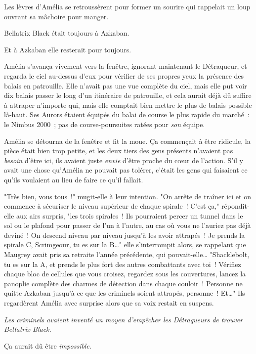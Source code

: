 Les lèvres d'Amélia se retroussèrent pour former un sourire qui rappelait un loup ouvrant sa mâchoire pour manger.

Bellatrix Black était toujours à Azkaban.

Et à Azkaban elle resterait pour toujours.

Amélia s'avança vivement vers la fenêtre, ignorant maintenant le Détraqueur, et regarda le ciel au-dessus d'eux pour vérifier de ses propres yeux la présence des balais en patrouille. Elle n'avait pas une vue complète du ciel, mais elle put voir dix balais passer le long d'un itinéraire de patrouille, et cela aurait déjà dû suffire à attraper n'importe qui, mais elle comptait bien mettre le plus de balais possible là-haut. Ses Aurors étaient équipés du balai de course le plus rapide du marché~: le Nimbus 2000~; pas de course-poursuites ratées pour \emph{son} équipe.

Amélia se détourna de la fenêtre et fit la moue. Ça commençait à être ridicule, la pièce était bien trop petite, et les deux tiers des gens présents n'avaient pas \emph{besoin} d'être ici, ils avaient juste \emph{envie} d'être proche du cœur de l'action. S'il y avait une chose qu'Amélia ne pouvait pas tolérer, c'était les gens qui faisaient ce qu'ils voulaient au lieu de faire ce qu'il fallait.

"Très bien, vous tous~!" mugit-elle à leur intention. "On arrête de traîner ici et on commence à sécuriser le niveau supérieur de chaque spirale~! C'est ça," répondit-elle aux airs surpris, "les trois spirales~! Ils pourraient percer un tunnel dans le sol ou le plafond pour passer de l'un à l'autre, au cas où vous ne l'auriez pas déjà deviné~! On descend niveau par niveau jusqu'à les avoir attrapés~! Je prends la spirale C, Scrimgeour, tu es sur la B…" elle s'interrompit alors, se rappelant que Maugrey avait pris sa retraite l'année précédente, qui pouvait-elle… "Shacklebolt, tu es sur la A, et prends le plus fort des autres combattants avec toi~! Vérifiez chaque bloc de cellules que vous croisez, regardez sous les couvertures, lancez la panoplie complète des charmes de détection dans chaque couloir~! Personne ne quitte Azkaban jusqu'à ce que les criminels soient attrapés, personne~! Et…" Ils regardèrent Amélia avec surprise alors que sa voix restait en suspens.

\emph{Les criminels avaient inventé un moyen d'empêcher les Détraqueurs de trouver Bellatrix Black.}

Ça aurait dû être \emph{impossible}.

